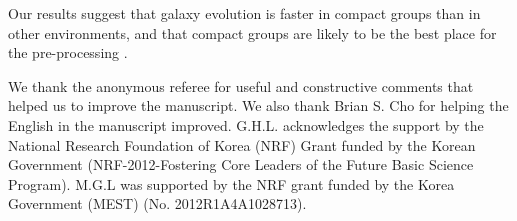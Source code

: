 \documentclass[12pt,preprint,apj]{emulateapj}
\begin{document}
Our results suggest that galaxy evolution is faster in compact groups than 
in other environments, and that compact groups are likely to be the best 
place for the pre-processing \citep{zabludoff98}.


\acknowledgments
We thank the anonymous referee for useful and constructive comments 
that helped us to improve the manuscript.
We also thank Brian S. Cho for helping the English in the manuscript improved.
G.H.L. acknowledges the support by the National Research Foundation of Korea (NRF) Grant funded 
by the Korean Government (NRF-2012-Fostering Core Leaders of the Future Basic Science Program).
M.G.L was supported by the NRF grant funded by the Korea Government (MEST) (No. 2012R1A4A1028713).
\end{document}
